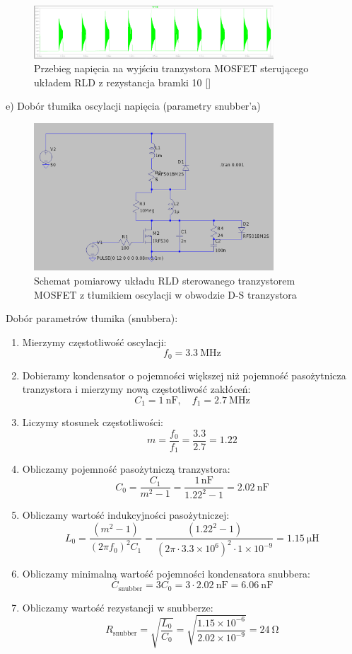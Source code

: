 \documentclass[11pt]{article}
\begin{document}
\begin{figure}[H]
\centering
\includegraphics[width=0.8\textwidth]{aun1_rld_without_snubber_rgate10ohm.png}
\caption{Przebieg napięcia na wyjściu tranzystora MOSFET sterującego układem RLD z rezystancja bramki 10 [\Omega]}
\end{figure}

e) Dobór tłumika oscylacji napięcia (parametry snubber'a)

\begin{figure}[H]
\centering
\includegraphics[width=0.8\textwidth]{aun1_rld_with_snubber.png}
\caption{Schemat pomiarowy układu RLD sterowanego tranzystorem MOSFET z tłumikiem oscylacji w obwodzie D-S tranzystora}
\end{figure}

Dobór parametrów tłumika (snubbera):
\begin{enumerate}
  \item Mierzymy częstotliwość oscylacji:
  \[
  f_0 = \SI{3.3}{\mega\hertz}
  \]
  \item Dobieramy kondensator o pojemności większej niż pojemność pasożytnicza tranzystora i mierzymy nową częstotliwość zakłóceń:
  \[
  C_1 = \SI{1}{\nano\farad}, \quad f_1 = \SI{2.7}{\mega\hertz}
  \]
  \item Liczymy stosunek częstotliwości:
  \[
  m = \frac{f_0}{f_1} = \frac{3.3}{2.7} = 1.22
  \]
  \item Obliczamy pojemność pasożytniczą tranzystora:
  \[
  C_0 = \frac{C_1}{m^2 - 1} = \frac{1\,\text{nF}}{1.22^2 - 1} = \SI{2.02}{\nano\farad}
  \]
  \item Obliczamy wartość indukcyjności pasożytniczej:
  \[
  L_0 = \frac{(m^2 - 1)}{(2\pi f_0)^2 C_1} = \frac{(1.22^2 - 1)}{(2\pi \cdot 3.3 \times 10^6)^2 \cdot 1 \times 10^{-9}} = \SI{1.15}{\micro\henry}
  \]
  \item Obliczamy minimalną wartość pojemności kondensatora snubbera:
  \[
  C_{\text{snubber}} = 3C_0 = 3 \cdot \SI{2.02}{\nano\farad} = \SI{6.06}{\nano\farad}
  \]
  \item Obliczamy wartość rezystancji w snubberze:
  \[
  R_{\text{snubber}} = \sqrt{\frac{L_0}{C_0}} = \sqrt{\frac{1.15 \times 10^{-6}}{2.02 \times 10^{-9}}} = \SI{24}{\ohm}
  \]
\end{enumerate}
\end{document}
